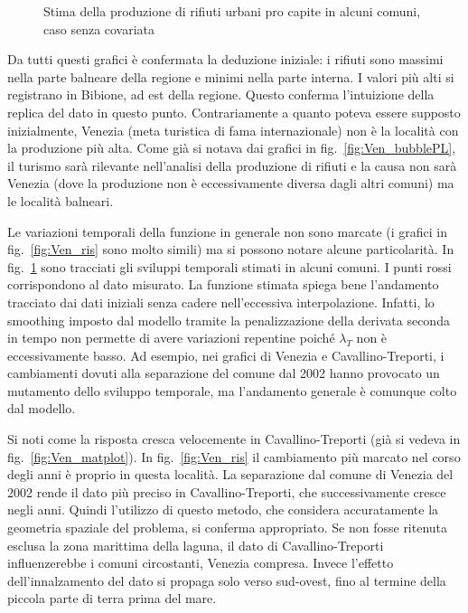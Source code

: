 \documentclass[a4paper,11pt,twoside,openright]{book}							%
\begin{document}
\begin{figure}[t]
{   }
	\caption{Stima della produzione di rifiuti urbani pro capite in alcuni comuni, caso senza covariata}
	\label{fig:Ven_tempo}
\end{figure}

Da tutti questi grafici è confermata la deduzione iniziale: i rifiuti sono massimi nella parte balneare della regione e minimi nella parte interna. I valori più alti si registrano in Bibione, ad est della regione. Questo conferma l'intuizione della replica del dato in questo punto. Contrariamente a quanto poteva essere supposto inizialmente, Venezia (meta turistica di fama internazionale) non è la località con la produzione più alta. Come già si notava dai grafici in fig.~\ref{fig:Ven_bubblePL}, il turismo sarà rilevante nell'analisi della produzione di rifiuti e la causa non sarà Venezia (dove la produzione non è eccessivamente diversa dagli altri comuni) ma le località balneari.

Le variazioni temporali della funzione in generale non sono marcate (i grafici in fig.~\ref{fig:Ven_ris} sono molto simili) ma si possono notare alcune particolarità. In fig.~\ref{fig:Ven_tempo} sono tracciati gli sviluppi temporali stimati in alcuni comuni. I punti rossi corrispondono al dato misurato. La funzione stimata spiega bene l'andamento tracciato dai dati iniziali senza cadere nell'eccessiva interpolazione. Infatti, lo smoothing imposto dal modello tramite la penalizzazione della derivata seconda in tempo non permette di avere variazioni repentine poiché $\lambda_T$ non è eccessivamente basso. Ad esempio, nei grafici di Venezia e Cavallino-Treporti, i cambiamenti dovuti alla separazione del comune dal 2002 hanno provocato un mutamento dello sviluppo temporale, ma l'andamento generale è comunque colto dal modello. 

Si noti come la risposta cresca velocemente in Cavallino-Treporti (già si vedeva in fig.~\ref{fig:Ven_matplot}). In fig.~\ref{fig:Ven_ris} il cambiamento più marcato nel corso degli anni è proprio in questa località. La separazione dal comune di Venezia del 2002 rende il dato più preciso in Cavallino-Treporti, che successivamente cresce negli anni. Quindi l'utilizzo di questo metodo, che considera accuratamente la geometria spaziale del problema, si conferma appropriato. Se non fosse ritenuta esclusa la zona marittima della laguna, il dato di Cavallino-Treporti influenzerebbe i comuni circostanti, Venezia compresa. Invece l'effetto dell'innalzamento del dato si propaga solo verso sud-ovest, fino al termine della piccola parte di terra prima del mare.
\end{document}
